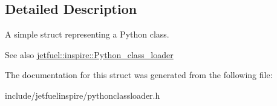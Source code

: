 \subsection{Detailed Description}
A simple struct representing a Python class.

\begin{DoxySeeAlso}{See also}
\hyperlink{classjetfuel_1_1inspire_1_1Python__class__loader}{jetfuel\+::inspire\+::\+Python\+\_\+class\+\_\+loader} 
\end{DoxySeeAlso}


The documentation for this struct was generated from the following file\+:\begin{DoxyCompactItemize}
\item 
include/jetfuelinspire/pythonclassloader.\+h\end{DoxyCompactItemize}
